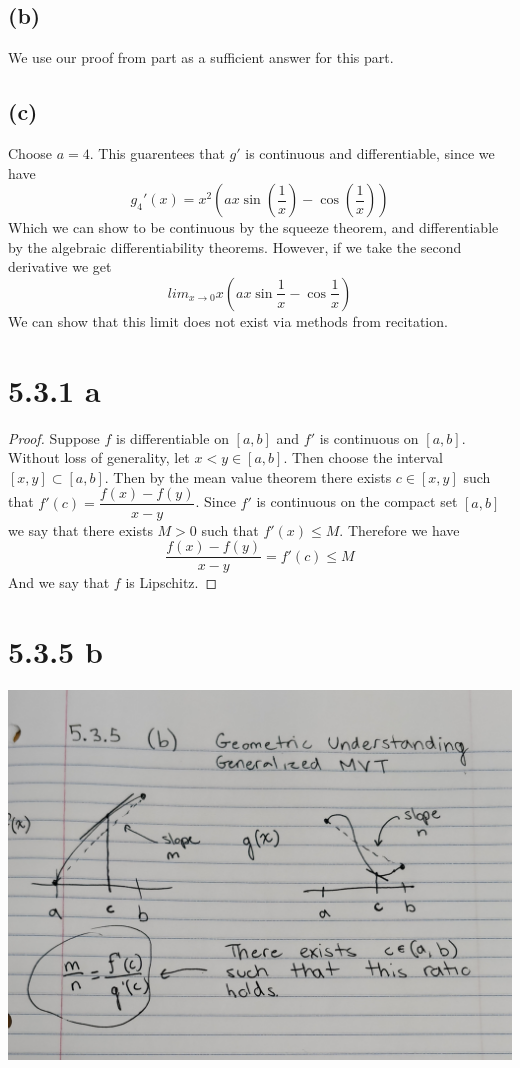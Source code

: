 \documentclass{article}
\begin{document}
\subsection*{(b)}
We use our proof from part  as a sufficient answer for this part.
\subsection*{(c)}
Choose $a = 4$. This guarentees that $g'$ is continuous and differentiable, since we have 
\[ g_4'(x) = x^2 \left(ax \sin\left(\frac{1}{x}\right) - \cos\left(\frac{1}{x}\right)\right)\]
Which we can show to be continuous by the squeeze theorem, and differentiable by the algebraic differentiability theorems. However, if we take the second derivative we get
\[ lim_{x \rightarrow 0}x(ax\sin{\frac{1}{x}}-\cos{\frac{1}{x}}) \]
We can show that this limit does not exist via methods from recitation.
\section*{5.3.1 a}
\begin{proof}
Suppose $f$ is differentiable on $[a,b]$ and $f'$ is continuous on $[a,b]$. Without loss of generality, let $x < y \in [a,b]$. Then choose the interval $[x,y] \subset [a,b]$. Then by the mean value theorem there exists $c \in [x,y]$ such that $f'(c) = \dfrac{f(x)-f(y)}{x-y}$. Since $f'$ is continuous on the compact set $[a,b]$ we say that there exists $M>0$ such that $f'(x) \leqslant M$. Therefore we have
\[ \frac{f(x) - f(y)}{x-y} = f'(c) \leqslant M \]
And we say that $f$ is Lipschitz.
\end{proof}

\section*{5.3.5 b}
\includegraphics[scale=0.1]{pic.jpg}
\end{document}

